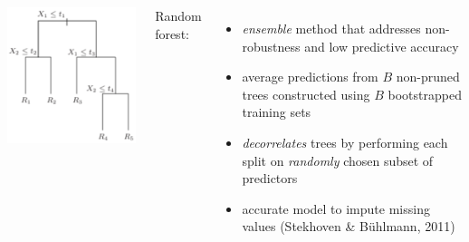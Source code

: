 \documentclass[20pt,margin=1in,innermargin=-4.5in,blockverticalspace=-0.25in]{tikzposter}
\begin{document}
\begin{columns}
{        \vspace{-2em}
        \begin{tikzfigure}
                \includegraphics[scale=1.9]{tree.png}
        \end{tikzfigure}
        \vspace{-1em}
        
        Random forest:
        \vspace{-0.5em}
        \begin{itemize}
            \item \textit{ensemble} method that addresses non-robustness and low predictive accuracy
            \vspace{-0.5em}
            \item average predictions from $B$ non-pruned trees constructed using $B$ bootstrapped training sets 
            \vspace{-0.5em}
            \item \textit{decorrelates} trees by performing each split on \textit{randomly} chosen subset of predictors
            \vspace{-0.5em}
            \item accurate model to impute missing values (Stekhoven \& Bühlmann, 2011)
            \vspace{-1em}
        \end{itemize} 
    }

\end{columns}
\end{document}
